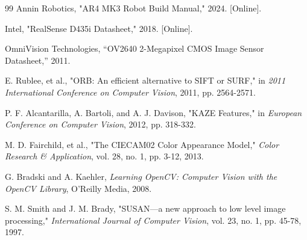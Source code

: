 \begin{thebibliography}{99}
 Annin Robotics, "AR4 MK3 Robot Build Manual," 2024. [Online]. 

 Intel, "RealSense D435i Datasheet," 2018. [Online]. 

 OmniVision Technologies, ``OV2640 2-Megapixel CMOS Image Sensor Datasheet,'' 2011.

 E. Rublee, et al., "ORB: An efficient alternative to SIFT or SURF," in \textit{2011 International Conference on Computer Vision}, 2011, pp. 2564-2571.

 P. F. Alcantarilla, A. Bartoli, and A. J. Davison, "KAZE Features," in \textit{European Conference on Computer Vision}, 2012, pp. 318-332.

 M. D. Fairchild, et al., "The CIECAM02 Color Appearance Model," \textit{Color Research \& Application}, vol. 28, no. 1, pp. 3-12, 2013.

 G. Bradski and A. Kaehler, \textit{Learning OpenCV: Computer Vision with the OpenCV Library}, O'Reilly Media, 2008.

 S. M. Smith and J. M. Brady, "SUSAN—a new approach to low level image processing," \textit{International Journal of Computer Vision}, vol. 23, no. 1, pp. 45-78, 1997.


\end{thebibliography}
